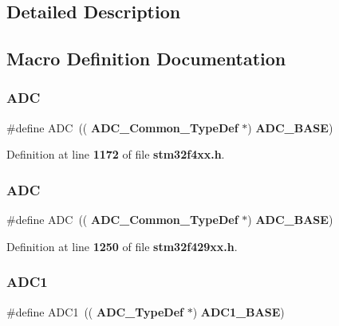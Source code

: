 \subsection{Detailed Description}


\subsection{Macro Definition Documentation}
\mbox{\label{group__Peripheral__declaration_ga54d148b91f3d356713f7e367a2243bea}} 
\subsubsection{A\+DC\hspace{0.1cm}{\footnotesize\ttfamily [1/2]}}
{\footnotesize\ttfamily \#define A\+DC~((\textbf{ A\+D\+C\+\_\+\+Common\+\_\+\+Type\+Def} $\ast$) \textbf{ A\+D\+C\+\_\+\+B\+A\+SE})}



Definition at line \textbf{ 1172} of file \textbf{ stm32f4xx.\+h}.

\mbox{\label{group__Peripheral__declaration_ga54d148b91f3d356713f7e367a2243bea}} 
\subsubsection{A\+DC\hspace{0.1cm}{\footnotesize\ttfamily [2/2]}}
{\footnotesize\ttfamily \#define A\+DC~((\textbf{ A\+D\+C\+\_\+\+Common\+\_\+\+Type\+Def} $\ast$) \textbf{ A\+D\+C\+\_\+\+B\+A\+SE})}



Definition at line \textbf{ 1250} of file \textbf{ stm32f429xx.\+h}.

\mbox{\label{group__Peripheral__declaration_ga90d2d5c526ce5c0a551f533eccbee71a}} 
\subsubsection{A\+D\+C1\hspace{0.1cm}{\footnotesize\ttfamily [1/2]}}
{\footnotesize\ttfamily \#define A\+D\+C1~((\textbf{ A\+D\+C\+\_\+\+Type\+Def} $\ast$) \textbf{ A\+D\+C1\+\_\+\+B\+A\+SE})}



